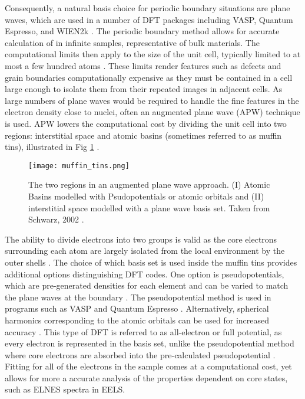 Consequently, a natural basis choice for periodic boundary situations are plane waves, which are used in a number of DFT packages including VASP, Quantum Espresso, and WIEN2k \cite{qe,vasp,wien2k}.  The periodic boundary method allows for accurate calculation of in infinite samples, representative of bulk materials.  The computational limits then apply to the size of the unit cell, typically limited to at most a few hundred atoms \cite{mohr_linear_2018}.  These limits render features such as defects and grain boundaries computationally expensive as they must be contained in a cell large enough to isolate them from their repeated images in adjacent cells. 
As large numbers of plane waves would be required to handle the fine features in the electron density close to nuclei, often an augmented plane wave (APW) technique is used.  APW lowers the computational cost by dividing the unit cell into two regions: interstitial space and atomic basins (sometimes referred to as muffin tins), illustrated  in Fig \ref{MT} \cite{wien2k}. \\
\begin{figure}
	\centering
	\texttt{[image: muffin\_tins.png]}
	\caption{The two regions in an augmented plane wave approach.  (I) Atomic Basins modelled with Psudopotentials or atomic orbitals and (II) interstitial space modelled with a plane wave basis set.  Taken from Schwarz, 2002 \cite{wien2k}. }
	\label{MT}   
\end{figure}

The ability to divide electrons into two groups is valid as the core electrons surrounding each atom are largely isolated from the local environment by the outer shells \cite{wien2k}. The choice of which basis set is used inside the muffin tins provides additional options distinguishing DFT codes.  One option is pseudopotentials, which are pre-generated densities for each element and can be varied to match the plane waves at the boundary \cite{singh_planewaves_2006}.  The pseudopotential method is used in programs such as VASP and Quantum Espresso \cite{vasp,qe}.  Alternatively, spherical harmonics corresponding to the atomic orbitals can be used for increased accuracy \cite{griffiths}. This type of DFT is referred to as all-electron or full potential, as every electron is represented in the basis set, unlike the pseudopotential method where core electrons are absorbed into the pre-calculated pseudopotential \cite{wien2k}. Fitting for all of the electrons in the sample comes at a computational cost, yet allows for more a accurate analysis of the properties dependent on core states, such as ELNES spectra in EELS.   \\
 
